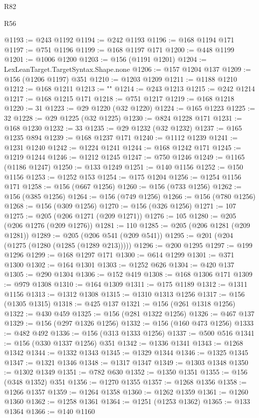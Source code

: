 \begin{lexlean}{R82}
\begin{lexlean}{R56}
\begin{coremodule}
{{{{{{{{{{{{{{{{{{{{{{{{{{{{{{{{{{{{{{{{{{{{{{{{{{{{{{{{{{{{{{{{{{{{{{{{{{{{{{{{{{{{{{{{{{{{{{{{{{{{{{{{{{{{{{{{{{{{{{{{{{{{{{{{{{{{{{{{{{{{{{{{{{{{{{{{{{{{{{{{{{{{{{{{{{{{{{{{{{{{{{{{{{{{{{{{{{{{{{{{{{{{{{{{{{{{@1193 := @243 @1192
@1194 := @242 @1193
@1196 := @168 @1194 @171
@1197 := @751 @1196
@1199 := @168 @1197 @171
@1200 := @448 @1199
@1201 := @1006 @1200
@1203 := @156 (@1191 @1201)
@1204 := LexLeanTarget.TargetSyntax.Shape.none
@1206 := @157 @1204 @137
@1209 := @156 (@1206 @1197) @351
@1210 := @1203 @1209
@1211 := @1188 @1210
@1212 := @168 @1211
@1213 := "}"
@1214 := @243 @1213
@1215 := @242 @1214
@1217 := @168 @1215 @171
@1218 := @751 @1217
@1219 := @168 @1218
@1220 := 31
@1223 := @29 @1220 (@32 @1220)
@1224 := @165 @1223
@1225 := 32
@1228 := @29 @1225 (@32 @1225)
@1230 := @824 @1228 @171
@1231 := @168 @1230
@1232 := 33
@1235 := @29 @1232 (@32 @1232)
@1237 := @165 @1235 @894
@1239 := @168 @1237 @171
@1240 := @1112 @1239
@1241 := @1231 @1240
@1242 := @1224 @1241
@1244 := @168 @1242 @171
@1245 := @1219 @1244
@1246 := @1212 @1245
@1247 := @750 @1246
@1249 := @1165 (@1186 @1247)
@1250 := @133 @1249
@1251 := @140 @1156
@1252 := @150 @1156
@1253 := @1252 @153
@1254 := @175 @1204
@1256 := @1254 @1156 @171
@1258 := @156 (@667 @1256)
@1260 := @156 (@733 @1256)
@1262 := @156 (@385 @1256)
@1264 := @156 (@749 @1256)
@1266 := @156 (@780 @1256)
@1268 := @156 (@309 @1256)
@1270 := @156 (@326 @1256)
@1271 := 107
@1275 := @205 (@206 @1271 (@209 @1271))
@1276 := 105
@1280 := @205 (@206 @1276 (@209 @1276))
@1281 := 110
@1285 := @205 (@206 @1281 (@209 @1281))
@1289 := @205 (@206 @541 (@209 @541))
@1295 := @201 (@204 (@1275 (@1280 (@1285 (@1289 @213)))))
@1296 := @200 @1295
@1297 := @199 @1296
@1299 := @168 @1297 @171
@1300 := @614 @1299
@1301 := @371 @1300
@1302 := @164 @1301
@1303 := @1252 @626
@1304 := @420 @137
@1305 := @290 @1304
@1306 := @152 @419
@1308 := @168 @1306 @171
@1309 := @979 @1308
@1310 := @164 @1309
@1311 := @175 @1189
@1312 := @1311 @1156
@1313 := @1312 @1308
@1315 := @1310 @1313 @1256
@1317 := @156 (@1305 @1315)
@1318 := @425 @137
@1321 := @156 (@261 @1318 @1256)
@1322 := @430 @459
@1325 := @156 (@281 @1322 @1256)
@1326 := @467 @137
@1329 := @156 (@297 @1326 @1256)
@1332 := @156 (@160 @473 @1256)
@1333 := @482 @492
@1336 := @156 (@313 @1333 @1256)
@1337 := @500 @516
@1341 := @156 (@330 @1337 @1256) @351
@1342 := @1336 @1341
@1343 := @1268 @1342
@1344 := @1332 @1343
@1345 := @1329 @1344
@1346 := @1325 @1345
@1347 := @1321 @1346
@1348 := @1317 @1347
@1349 := @1303 @1348
@1350 := @1302 @1349
@1351 := @782 @630
@1352 := @1350 @1351
@1355 := @156 (@348 @1352) @351
@1356 := @1270 @1355
@1357 := @1268 @1356
@1358 := @1266 @1357
@1359 := @1264 @1358
@1360 := @1262 @1359
@1361 := @1260 @1360
@1362 := @1258 @1361
@1364 := @1251 (@1253 @1362)
@1365 := @133 @1364
@1366 := @140 @1160
}}}}}}}}}}}}}}}}}}}}}}}}}}}}}}}}}}}}}}}}}}}}}}}}}}}}}}}}}}}}}}}}}}}}}}}}}}}}}}}}}}}}}}}}}}}}}}}}}}}}}}}}}}}}}}}}}}}}}}}}}}}}}}}}}}}}}}}}}}}}}}}}}}}}}}}}}}}}}}}}}}}}}}}}}}}}}}}}}}}}}}}}}}}}}}}}}}}}}}}}}}}}}}}}}}}
\end{coremodule}
\end{lexlean}
\end{lexlean}
